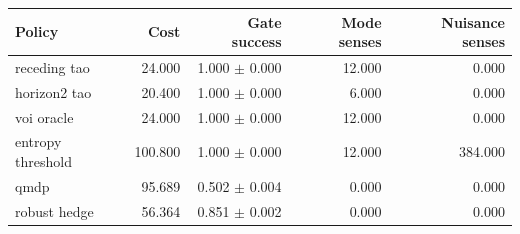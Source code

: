 \begin{tabular}{lrrrr}
\toprule
Policy & Cost & Gate success & Mode senses & Nuisance senses \\
\midrule
receding tao & 24.000 & 1.000 $\pm$ 0.000 & 12.000 & 0.000 \\
horizon2 tao & 20.400 & 1.000 $\pm$ 0.000 & 6.000 & 0.000 \\
voi oracle & 24.000 & 1.000 $\pm$ 0.000 & 12.000 & 0.000 \\
entropy threshold & 100.800 & 1.000 $\pm$ 0.000 & 12.000 & 384.000 \\
qmdp & 95.689 & 0.502 $\pm$ 0.004 & 0.000 & 0.000 \\
robust hedge & 56.364 & 0.851 $\pm$ 0.002 & 0.000 & 0.000 \\
\bottomrule
\end{tabular}
